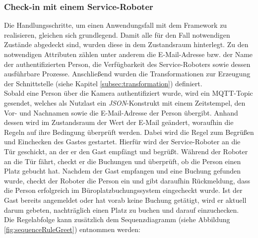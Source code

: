     \subsubsection*{Check-in mit einem Service-Roboter}
        Die Handlungsschritte, um einen Anwendungsfall mit dem Framework zu realisieren, gleichen sich grundlegend. 
        Damit alle für den Fall notwendigen Zustände abgedeckt sind, wurden diese in dem Zustandsraum hinterlegt. Zu den notwendigen Attributen 
        zählen unter anderem die E-Mail-Adresse bzw. der Name der authentifizierten Person, die Verfügbarkeit des Service-Roboters sowie dessen 
        ausführbare Prozesse. Anschließend wurden die Transformationen zur Erzeugung der Schnittstelle (siehe Kapitel \ref{subsec:transformation}) definiert. 
        \\
        \linebreak
        Sobald eine Person über die Kamera authentifiziert wurde, wird ein \acs{MQTT}-Topic gesendet, welches als Nutzlast ein \textit{JSON}-Konstrukt mit einem Zeitstempel, den 
        Vor- und Nachnamen sowie die E-Mail-Adresse der Person übergibt. Anhand dessen wird im Zustandsraum der Wert der E-Mail geändert, woraufhin die Regeln auf ihre 
        Bedingung überprüft werden. Dabei wird die Regel zum Begrüßen und Einchecken des Gastes gestartet. Hierfür wird der Service-Roboter an die Tür geschickt, an der er den 
        Gast empfängt und begrüßt. Während der Roboter an die Tür fährt, checkt er die Buchungen und überprüft, ob die Person einen Platz gebucht hat. 
        Nachdem der Gast empfangen und eine Buchung gefunden wurde, checkt der Roboter die Person ein und gibt daraufhin Rückmeldung, dass die Person erfolgreich im 
        Büroplatzbuchungssystem eingecheckt wurde. Ist der Gast bereits angemeldet oder hat vorab keine Buchung getätigt, wird er aktuell darum gebeten, nachträglich 
        einen Platz zu buchen und darauf einzuchecken. 
        \\
        Die Regelabfolge kann zusätzlich dem Sequenzdiagramm (siehe Abbildung \ref{fig:sequenceRuleGreet}) entnommen werden:
